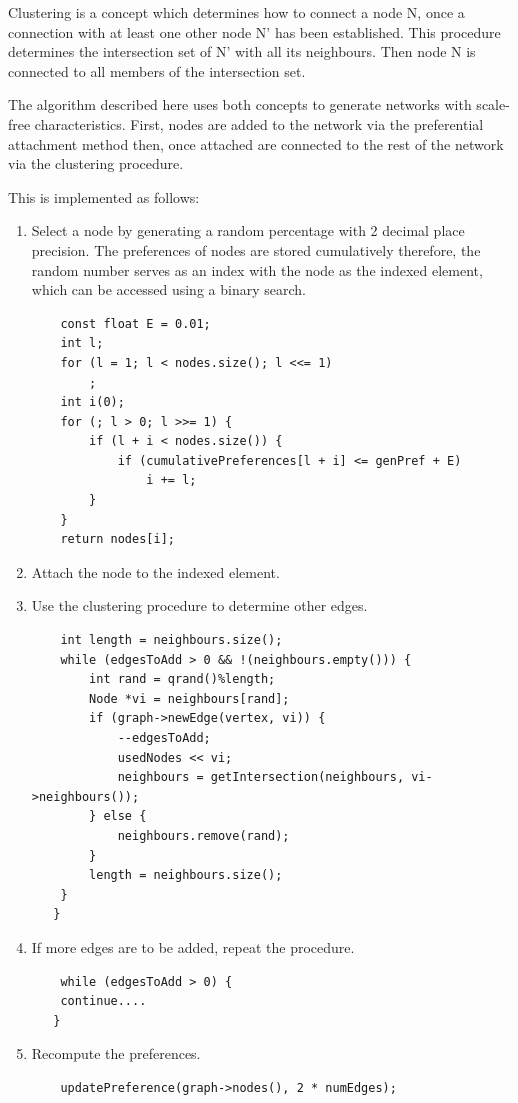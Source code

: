\documentclass[a4paper,11pt,titlepage]{article}
\begin{document}
Clustering is a concept which determines how to connect a node N, once a connection with at least one other node N' has been established. This procedure determines the intersection set of N' with all its neighbours. Then node N is connected to all members of the intersection set.

The algorithm described here uses both concepts to generate networks with scale-free characteristics. First, nodes are added to the network via the preferential attachment method then, once attached are connected to the rest of the network via the clustering procedure.

This is implemented as follows:
\begin{enumerate}
\item Select a node by generating a random percentage with 2 decimal place
precision.
The preferences of nodes are stored cumulatively therefore, the random number
serves as an index with the node as the indexed element, which can be accessed
using a binary search.
\begin{lstlisting}
    const float E = 0.01;
    int l;
    for (l = 1; l < nodes.size(); l <<= 1)
        ;
    int i(0);
    for (; l > 0; l >>= 1) {
        if (l + i < nodes.size()) {
            if (cumulativePreferences[l + i] <= genPref + E)
                i += l;
        }
    }
    return nodes[i];
\end{lstlisting}
   \item Attach the node to the indexed element.
   \item Use the clustering procedure to determine other edges.
\begin{lstlisting}
    int length = neighbours.size();
    while (edgesToAdd > 0 && !(neighbours.empty())) {
        int rand = qrand()%length;
        Node *vi = neighbours[rand];
        if (graph->newEdge(vertex, vi)) {
            --edgesToAdd;
            usedNodes << vi;
            neighbours = getIntersection(neighbours, vi->neighbours());
        } else {
            neighbours.remove(rand);
        }
        length = neighbours.size();
    }
   }  
\end{lstlisting}
   \item If more edges are to be added, repeat the procedure.
\begin{lstlisting}
    while (edgesToAdd > 0) {
	continue....
   }
\end{lstlisting}
   \item Recompute the preferences.
\begin{lstlisting}
	updatePreference(graph->nodes(), 2 * numEdges);
\end{lstlisting}

\end{enumerate}
\end{document}
